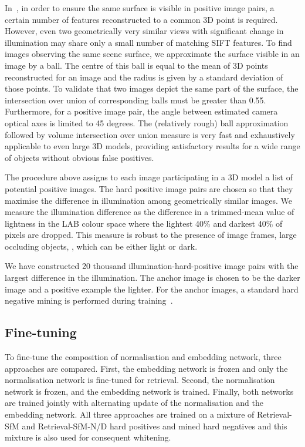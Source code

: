 \begin{figure*}
In~\cite{Radenovic-TPAMI18}, in order to ensure the same surface is visible in positive image pairs, a certain number of features reconstructed to a common 3D point is required. However, even two geometrically very similar views with significant change in illumination may share only a small number of matching SIFT features. To find images observing the same scene surface, we approximate the surface visible in an image by a ball. The centre of this ball is equal to the mean of 3D points reconstructed for an image and the radius is given by a standard deviation of those points. To validate that two images depict the same part of the surface, the intersection over union of corresponding balls must be greater than 0.55. Furthermore, for a positive image pair, the angle between estimated camera optical axes is limited to 45 degrees.
The (relatively rough) ball approximation followed by volume intersection over union measure is very fast and exhaustively applicable to even large 3D models, providing satisfactory results for a wide range of objects without obvious false positives.

The procedure above assigns to each image participating in a 3D model a list of potential positive images.
The hard positive image pairs are chosen so that they maximise the difference in illumination among geometrically similar images. We measure the illumination difference as the difference in a trimmed-mean value of lightness in the LAB colour space where the lightest 40\% and darkest 40\% of pixels are dropped. This measure is robust to the presence of image frames, large occluding objects, \etc, which can be either light or dark.

We have constructed 20 thousand illumination-hard-positive image pairs with the largest difference in the illumination. The anchor image is chosen to be the darker image and a positive example the lighter. For the anchor images, a standard hard negative mining is performed during training~\cite{Radenovic-TPAMI18}. 

\subsection{Fine-tuning}

To fine-tune the composition of normalisation and embedding network, three approaches are compared. First, the embedding network is frozen and only the normalisation network is fine-tuned for retrieval. Second, the normalisation network is frozen, and the embedding network is trained. Finally, both networks are trained jointly with alternating update of the normalisation and the embedding network. All three approaches are trained on a mixture of Retrieval-SfM and Retrieval-SfM-N/D hard positives and mined hard negatives and this mixture is also used for consequent whitening.


\end{figure*}
